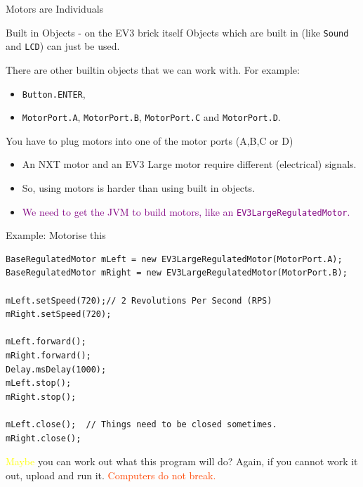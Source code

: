 \documentclass[color=pdftex,usenames,dvipsnames, aspectratio=169]{beamer}
\begin{document}
\begin{frame}{Motors are Individuals}
\begin{block}{Built in Objects - on the EV3 brick itself}
\alert{Objects which are built in (like \lstinline!Sound! and  \lstinline!LCD!) can just be used.}

There are other builtin objects that we can work with.  For example:
\begin{itemize}
\item \lstinline!Button.ENTER!,
\item \lstinline!MotorPort.A!, \lstinline!MotorPort.B!, \lstinline!MotorPort.C! and \lstinline!MotorPort.D!.
\end{itemize}
\end{block}

\begin{block}{You have to plug motors into one of the motor ports (A,B,C or D)}
\begin{itemize}
\item An NXT motor and an EV3 Large motor require different (electrical) signals.
\item So, \alert{using motors is harder} than using built in objects.
\item \textcolor{purple}{We need to get the JVM to build motors, like an \lstinline!EV3LargeRegulatedMotor!.}
\end{itemize}
\end{block}

\end{frame}

\begin{frame}[fragile,label=motors]{Example: Motorise this}
\begin{lstlisting}[basicstyle=\ttfamily\scriptsize\color{blue},linewidth=14cm,emph={BaseRegulatedMotor, EV3LargeRegulatedMotor}]
BaseRegulatedMotor mLeft = new EV3LargeRegulatedMotor(MotorPort.A);
BaseRegulatedMotor mRight = new EV3LargeRegulatedMotor(MotorPort.B);

mLeft.setSpeed(720);// 2 Revolutions Per Second (RPS)
mRight.setSpeed(720);

mLeft.forward();
mRight.forward();
Delay.msDelay(1000);
mLeft.stop();
mRight.stop();

mLeft.close();  // Things need to be closed sometimes.
mRight.close();
\end{lstlisting}

\begin{block}{\textcolor{yellow}{Maybe} you can work out what this program will do?}
Again, if you cannot work it out, upload and run it.  \textcolor{OrangeRed}{Computers do not break.}
\end{block}
\end{frame}
\end{document}
